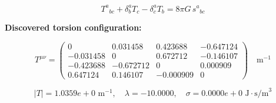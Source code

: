 
\begin{equation}
  T^a{}_{bc} + \delta^a_b T_c - \delta^a_c T_b = 8\pi G \, s^a{}_{bc}
\end{equation}

\textbf{Discovered torsion configuration:}

\begin{equation}
  T^{\mu\nu} = \begin{pmatrix}
    0 & 0.031458 & 0.423688 & -0.647124 \\
    -0.031458 & 0 & 0.672712 & -0.146107 \\
    -0.423688 & -0.672712 & 0 & 0.000909 \\
    0.647124 & 0.146107 & -0.000909 & 0
  \end{pmatrix} \quad \text{m}^{-1}
\end{equation}

\begin{equation}
  |T| = 1.0359e+0 \text{ m}^{-1}, \quad
  \lambda = -10.0000, \quad
  \sigma = 0.0000e+0 \text{ J}\cdot\text{s/m}^3
\end{equation}